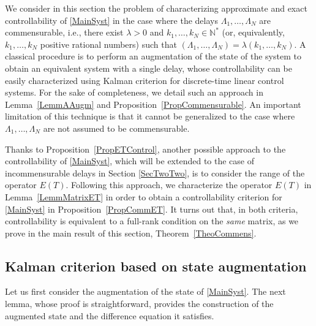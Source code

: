 \documentclass[10pt]{article}
\newcommand{\ie}{i.e.,\xspace}
\theoremstyle{plain}
\theoremstyle{definition}
\numberwithin{equation}{section}\numberwithin{figure}{section}\emergencystretch=3em
\begin{document}
We consider in this section the problem of characterizing approximate and exact controllability of \eqref{MainSyst} in the case where the delays $\Lambda_1, \dots, \Lambda_N$ are commensurable, \ie there exist $\lambda > 0$ and $k_1, \dots, k_N \in \mathbb N^\ast$ (or, equivalently, $k_1, \dots, k_N$ positive rational numbers) such that $(\Lambda_1, \dots, \Lambda_N) = \lambda (k_1, \dots, k_N)$. A classical procedure is to perform an augmentation of the state of the system to obtain an equivalent system with a single delay, whose controllability can be easily characterized using Kalman criterion for discrete-time linear control systems. For the sake of completeness, we detail such an approach in Lemma~\ref{LemmAAugm} and Proposition~\ref{PropCommensurable}. An important limitation of this technique is that it cannot be generalized to the case where $\Lambda_1, \dots, \Lambda_N$ are not assumed to be commensurable.

Thanks to Proposition~\ref{PropETControl}, another possible approach to the controllability of \eqref{MainSyst}, which will be extended to the case of incommensurable delays in Section \ref{SecTwoTwo}, is to consider the range of the operator $E(T)$. Following this approach, we characterize the operator $E(T)$ in Lemma~\ref{LemmMatrixET} in order to obtain a controllability criterion for \eqref{MainSyst} in Proposition~\ref{PropCommET}. It turns out that, in both criteria, controllability is equivalent to a full-rank condition on the \emph{same} matrix, as we prove in the main result of this section, Theorem~\ref{TheoCommens}.

\subsection{Kalman criterion based on state augmentation}

Let us first consider the augmentation of the state of \eqref{MainSyst}. The next lemma, whose proof is straightforward, provides the construction of the augmented state and the difference equation it satisfies.
\end{document}
